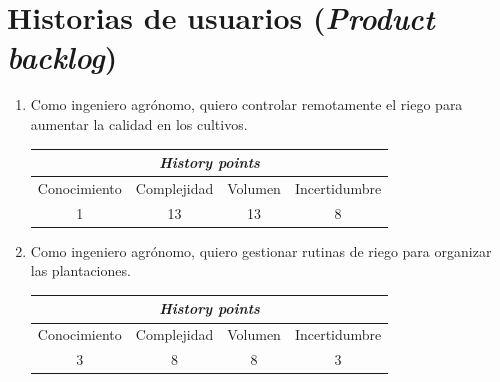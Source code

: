 \documentclass[11pt]{charter}
\begin{document}
\section{Historias de usuarios (\textit{Product backlog})}
\label{sec:backlog}

\begin{enumerate}

	\item Como ingeniero agrónomo, quiero controlar remotamente el riego para aumentar la calidad en los cultivos.
	\begin{table}[h]
		\begin{center}
			\begin{tabular}{|c|c|c|c|} \hline
				\multicolumn{4}{|c|}{\textbf{\textit{History points}}} \\\hline
  			Conocimiento & Complejidad & Volumen & Incertidumbre \\\hline
    			  1 	   &     13       &   13     &      8        \\\hline
			\end{tabular}
		\end{center}
	\end{table}


	 \item Como ingeniero agrónomo, quiero gestionar rutinas de riego para organizar las plantaciones.
	 \begin{table}[h]
		\begin{center}
			\begin{tabular}{|c|c|c|c|} \hline
				\multicolumn{4}{|c|}{\textbf{\textit{History points}}} \\\hline
  			Conocimiento & Complejidad & Volumen & Incertidumbre \\\hline
    			  3 	   &     8       &   8     &      3        \\\hline
			\end{tabular}
		\end{center}
	\end{table}


\end{enumerate}
\end{document}
